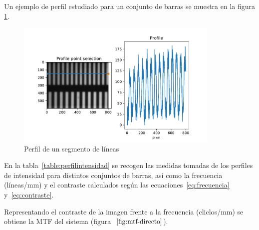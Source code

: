 \documentclass{./packages/optica-article}
\begin{document}
Un ejemplo de perfil estudiado para un conjunto de barras se muestra en la figura \ref{fig:perfil:example}.

\begin{figure}
	\centering
	\includegraphics[height=6cm]{profile-lines.pdf}
	\caption{Perfil de un segmento de líneas}\label{fig:perfil:example}
\end{figure}

En la tabla~\ref{table:perfilintensidad} se recogen las medidas tomadas de los perfiles de intensidad para distintos conjuntos de barras, así como la frecuencia (líneas/mm) y el contraste calculados según las ecuaciones~\ref{eq:frecuencia} y~\ref{eq:contraste}.

\begin{table}[hbp]
	\centering
	\caption{Datos de los perfiles de intensidad. $y$: intensidad. $x$. El contraste se ha obtenido a partir de la ecuación~\ref{eq:contraste}. La frecuencia se ha obtenido a través de la ecuación~\ref{eq:frecuencia}. Como se obtienen los periodos se explica visualmente en la Fig.~\ref{fig:perfil:example}}%
	\label{table:perfilintensidad}
\end{table}

Representando el contraste de la imagen frente a la frecuencia (cliclos/mm) se obtiene la MTF del sistema (figura $~\ref{fig:mtf-directo}$).
\end{document}
